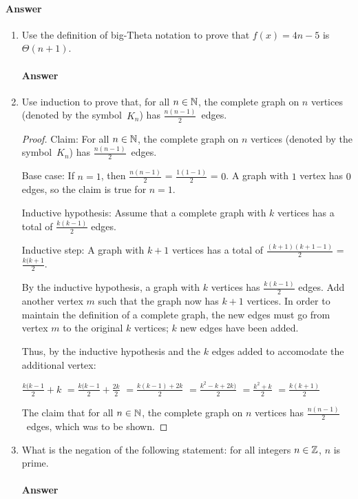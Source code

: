 \documentclass{article}
\begin{document}
\paragraph{Answer}
\todo{}

\collab{\todo{}}

\begin{enumerate}

    \item Use the definition of big-Theta notation to prove that $f(x)=4n-5$
        is $\Theta(n+1)$.

        \paragraph{Answer}
        \todo{}

    \item Use induction to prove that, for all $n \in {\mathbb N}$, the complete graph on
        $n$ vertices (denoted by the symbol~$K_n$) has $\frac{n(n-1)}{2}$~edges.

        \begin{proof}
	Claim: For all $n \in {\mathbb N}$, the complete graph on
        $n$ vertices (denoted by the symbol~$K_n$) has $\frac{n(n-1)}{2}$~edges.
	
	Base case: If $n = 1$, then $\frac{n(n-1)}{2}$ = $\frac{1(1-1)}{2}$ = $0$. A graph with $1$ vertex has $0$ edges, so the claim is true for $n = 1$.

	Inductive hypothesis: Assume that a complete graph with $k$ vertices has a total of $\frac{k(k-1)}{2}$ edges.

	Inductive step: A graph with $k + 1$ vertices has a total of $\frac{(k+1)(k+1-1)}{2}$ = $\frac{k(k+1}{2}$. 

	By the inductive hypothesis, a graph with $k$ vertices has $\frac{k(k-1)}{2}$ edges. Add another vertex $m$ such that the graph now has $k+1$ vertices. In order to maintain the definition of a complete graph, the new edges must go from vertex $m$ to the original $k$ vertices; $k$ new edges have been added. 

	Thus, by the inductive hypothesis and the $k$ edges added to accomodate the additional vertex: 

	$\frac{k(k-1}{2} + k$
	$= \frac{k(k-1}{2} + \frac{2k}{2}$
	$ = \frac{k(k-1) + 2k}{2}$
	$ = \frac{k^2 - k +2k)}{2} $
	$ = \frac{k^2 + k}{2}$
	$ = \frac{k(k+1)}{2}$
	
	The claim that for all $n \in {\mathbb N}$, the complete graph on $n$ vertices has $\frac{n(n-1)}{2}$~edges, which was to be shown.
        \end{proof}

    \item What is the negation of the following statement: for all integers $n
        \in {\mathbb Z}$, $n$ is prime.

        \paragraph{Answer}
        \todo{}

\end{enumerate}
\end{document}
